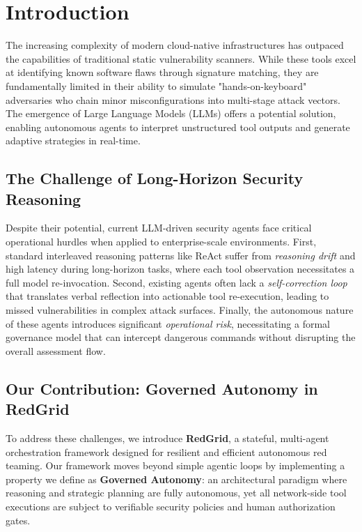 \section{Introduction}

The increasing complexity of modern cloud-native infrastructures has outpaced the capabilities of traditional static vulnerability scanners. While these tools excel at identifying known software flaws through signature matching, they are fundamentally limited in their ability to simulate "hands-on-keyboard" adversaries who chain minor misconfigurations into multi-stage attack vectors. The emergence of Large Language Models (LLMs) offers a potential solution, enabling autonomous agents to interpret unstructured tool outputs and generate adaptive strategies in real-time.

\subsection{The Challenge of Long-Horizon Security Reasoning}
Despite their potential, current LLM-driven security agents face critical operational hurdles when applied to enterprise-scale environments. First, standard interleaved reasoning patterns like ReAct suffer from \textit{reasoning drift} and high latency during long-horizon tasks, where each tool observation necessitates a full model re-invocation. Second, existing agents often lack a \textit{self-correction loop} that translates verbal reflection into actionable tool re-execution, leading to missed vulnerabilities in complex attack surfaces. Finally, the autonomous nature of these agents introduces significant \textit{operational risk}, necessitating a formal governance model that can intercept dangerous commands without disrupting the overall assessment flow.

\subsection{Our Contribution: Governed Autonomy in RedGrid}
To address these challenges, we introduce \textbf{RedGrid}, a stateful, multi-agent orchestration framework designed for resilient and efficient autonomous red teaming. Our framework moves beyond simple agentic loops by implementing a property we define as \textbf{Governed Autonomy}: an architectural paradigm where reasoning and strategic planning are fully autonomous, yet all network-side tool executions are subject to verifiable security policies and human authorization gates. 

